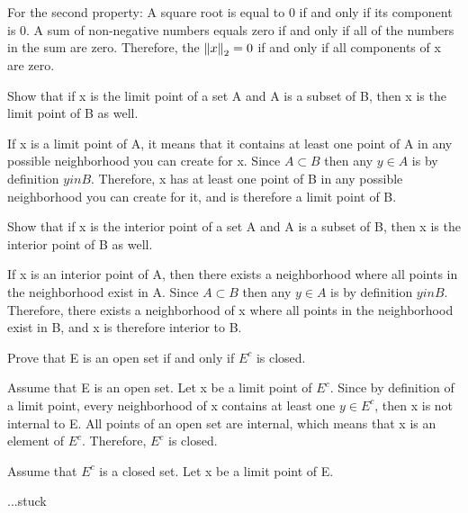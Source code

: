 \documentclass[12pt]{article}
\newenvironment{exercise}[2][Exercise]{\begin{trivlist}
\item[\hskip \labelsep {\bfseries #1}\hskip \labelsep {\bfseries #2.}]}{\end{trivlist}}
\begin{document}
For the second property: A square root is equal to 0 if and only if its component is 0. A sum of non-negative numbers equals zero if and only if all of the numbers in the sum are zero. Therefore, the $\left\lVert x\right\rVert_{2} = 0$ if and only if all components of x are zero.

\begin{exercise}{2.1}
Show that if x is the limit point of a set A and  A is a subset of B, then x is the limit point of B as well.
\end{exercise}
If x is a limit point of A, it means that it contains at least one point of A in any possible neighborhood you can create for x. Since $A\subset B$ then any $y\in A$ is by definition $y in B$. Therefore, x has at least one point of B in any possible neighborhood you can create for it, and is therefore a limit point of B.

\begin{exercise}{2.2}
Show that if x is the interior point of a set A and  A is a subset of B, then x is the interior point of B as well.
\end{exercise}
If x is an interior point of A, then there exists a neighborhood where all points in the neighborhood exist in A. Since $A\subset B$ then any $y\in A$ is by definition $y in B$. Therefore, there exists a neighborhood of x where all points in the neighborhood exist in B, and x is therefore interior to B.

\begin{exercise}{2.3}
Prove that E is an open set if and only if  $E^{c}$ is closed.
\end{exercise}
Assume that E is an open set. Let x be a limit point of $E^c$. Since by definition of a limit point, every neighborhood of x contains at least one $y \in E^c$, then x is not internal to E. All points of an open set are internal, which means that x is an element of $E^{c}$. Therefore, $E^{c}$ is closed.

Assume that $E^{c}$ is a closed set. Let x be a limit point of E.

...stuck
\end{document}
